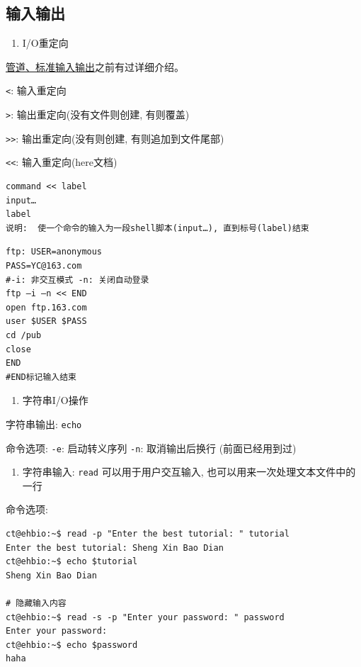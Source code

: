 \documentclass[]{article}
\providecommand{\tightlist}{%
  \setlength{\itemsep}{0pt}\setlength{\parskip}{0pt}}
\numberwithin{figure}{section}
\numberwithin{table}{section}
\begin{document}
\hypertarget{bash_inputoutput}{%
\subsection{输入输出}\label{bash_inputoutput}}

\begin{enumerate}
\def\labelenumi{\arabic{enumi}.}
\tightlist
\item
  I/O重定向
\end{enumerate}

\href{http://mp.weixin.qq.com/s/zL9Mw_2ig48gHrIjKM0CMw}{管道、标准输入输出}之前有过详细介绍。

\texttt{\textless{}}: 输入重定向

\texttt{\textgreater{}}: 输出重定向(没有文件则创建, 有则覆盖)

\texttt{\textgreater{}\textgreater{}}: 输出重定向(没有则创建, 有则追加到文件尾部)

\texttt{\textless{}\textless{}}: 输入重定向(here文档)

\begin{verbatim}
command << label  
input…  
label  
说明:  使一个命令的输入为一段shell脚本(input…), 直到标号(label)结束  
\end{verbatim}

\begin{verbatim}
ftp: USER=anonymous  
PASS=YC@163.com  
#-i: 非交互模式 -n: 关闭自动登录  
ftp –i –n << END 
open ftp.163.com  
user $USER $PASS  
cd /pub  
close  
END
#END标记输入结束 
\end{verbatim}

\begin{enumerate}
\def\labelenumi{\arabic{enumi}.}
\setcounter{enumi}{1}
\tightlist
\item
  字符串I/O操作
\end{enumerate}

字符串输出: \texttt{echo}

命令选项: \texttt{-e}: 启动转义序列 \texttt{-n}: 取消输出后换行 (前面已经用到过)

\begin{enumerate}
\def\labelenumi{\arabic{enumi}.}
\setcounter{enumi}{2}
\tightlist
\item
  字符串输入: \texttt{read} 可以用于用户交互输入, 也可以用来一次处理文本文件中的一行
\end{enumerate}

命令选项:

\begin{verbatim}
ct@ehbio:~$ read -p "Enter the best tutorial: " tutorial
Enter the best tutorial: Sheng Xin Bao Dian
ct@ehbio:~$ echo $tutorial
Sheng Xin Bao Dian

# 隐藏输入内容
ct@ehbio:~$ read -s -p "Enter your password: " password
Enter your password: 
ct@ehbio:~$ echo $password
haha
\end{verbatim}
\end{document}
